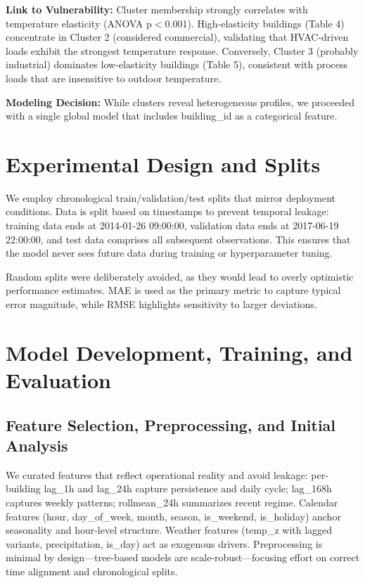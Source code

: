 \documentclass[11pt,a4paper]{article}
\begin{document}
\textbf{Link to Vulnerability:}
Cluster membership strongly correlates with temperature elasticity (ANOVA p$<$0.001). High-elasticity buildings (Table 4) concentrate in Cluster 2 (considered commercial), validating that HVAC-driven loads exhibit the strongest temperature response. Conversely, Cluster 3 (probably industrial) dominates low-elasticity buildings (Table 5), consistent with process loads that are insensitive to outdoor temperature.

\textbf{Modeling Decision:}
While clusters reveal heterogeneous profiles, we proceeded with a single global model that includes building\_id as a categorical feature.

\section{Experimental Design and Splits}

We employ chronological train/validation/test splits that mirror deployment conditions. Data is split based on timestamps to prevent temporal leakage: training data ends at 2014-01-26 09:00:00, validation data ends at 2017-06-19 22:00:00, and test data comprises all subsequent observations. This ensures that the model never sees future data during training or hyperparameter tuning.

Random splits were deliberately avoided, as they would lead to overly optimistic performance estimates. MAE is used as the primary metric to capture typical error magnitude, while RMSE highlights sensitivity to larger deviations.

\section{Model Development, Training, and Evaluation}

\subsection{Feature Selection, Preprocessing, and Initial Analysis}

We curated features that reflect operational reality and avoid leakage: per-building lag\_1h and lag\_24h capture persistence and daily cycle; lag\_168h captures weekly patterns; rollmean\_24h summarizes recent regime. Calendar features (hour, day\_of\_week, month, season, is\_weekend, is\_holiday) anchor seasonality and hour-level structure. Weather features (temp\_z with lagged variants, precipitation, is\_day) act as exogenous drivers. Preprocessing is minimal by design---tree-based models are scale-robust---focusing effort on correct time alignment and chronological splits.
\end{document}
